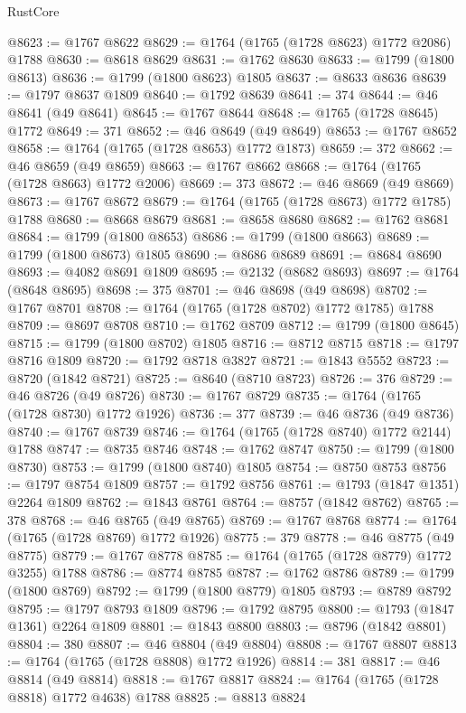 \begin{lexlean}{RustCore}
\begin{coremodule}
@8623 := @1767 @8622
@8629 := @1764 (@1765 (@1728 @8623) @1772 @2086) @1788
@8630 := @8618 @8629
@8631 := @1762 @8630
@8633 := @1799 (@1800 @8613)
@8636 := @1799 (@1800 @8623) @1805
@8637 := @8633 @8636
@8639 := @1797 @8637 @1809
@8640 := @1792 @8639
@8641 := 374
@8644 := @46 @8641 (@49 @8641)
@8645 := @1767 @8644
@8648 := @1765 (@1728 @8645) @1772
@8649 := 371
@8652 := @46 @8649 (@49 @8649)
@8653 := @1767 @8652
@8658 := @1764 (@1765 (@1728 @8653) @1772 @1873)
@8659 := 372
@8662 := @46 @8659 (@49 @8659)
@8663 := @1767 @8662
@8668 := @1764 (@1765 (@1728 @8663) @1772 @2006)
@8669 := 373
@8672 := @46 @8669 (@49 @8669)
@8673 := @1767 @8672
@8679 := @1764 (@1765 (@1728 @8673) @1772 @1785) @1788
@8680 := @8668 @8679
@8681 := @8658 @8680
@8682 := @1762 @8681
@8684 := @1799 (@1800 @8653)
@8686 := @1799 (@1800 @8663)
@8689 := @1799 (@1800 @8673) @1805
@8690 := @8686 @8689
@8691 := @8684 @8690
@8693 := @4082 @8691 @1809
@8695 := @2132 (@8682 @8693)
@8697 := @1764 (@8648 @8695)
@8698 := 375
@8701 := @46 @8698 (@49 @8698)
@8702 := @1767 @8701
@8708 := @1764 (@1765 (@1728 @8702) @1772 @1785) @1788
@8709 := @8697 @8708
@8710 := @1762 @8709
@8712 := @1799 (@1800 @8645)
@8715 := @1799 (@1800 @8702) @1805
@8716 := @8712 @8715
@8718 := @1797 @8716 @1809
@8720 := @1792 @8718 @3827
@8721 := @1843 @5552
@8723 := @8720 (@1842 @8721)
@8725 := @8640 (@8710 @8723)
@8726 := 376
@8729 := @46 @8726 (@49 @8726)
@8730 := @1767 @8729
@8735 := @1764 (@1765 (@1728 @8730) @1772 @1926)
@8736 := 377
@8739 := @46 @8736 (@49 @8736)
@8740 := @1767 @8739
@8746 := @1764 (@1765 (@1728 @8740) @1772 @2144) @1788
@8747 := @8735 @8746
@8748 := @1762 @8747
@8750 := @1799 (@1800 @8730)
@8753 := @1799 (@1800 @8740) @1805
@8754 := @8750 @8753
@8756 := @1797 @8754 @1809
@8757 := @1792 @8756
@8761 := @1793 (@1847 @1351) @2264 @1809
@8762 := @1843 @8761
@8764 := @8757 (@1842 @8762)
@8765 := 378
@8768 := @46 @8765 (@49 @8765)
@8769 := @1767 @8768
@8774 := @1764 (@1765 (@1728 @8769) @1772 @1926)
@8775 := 379
@8778 := @46 @8775 (@49 @8775)
@8779 := @1767 @8778
@8785 := @1764 (@1765 (@1728 @8779) @1772 @3255) @1788
@8786 := @8774 @8785
@8787 := @1762 @8786
@8789 := @1799 (@1800 @8769)
@8792 := @1799 (@1800 @8779) @1805
@8793 := @8789 @8792
@8795 := @1797 @8793 @1809
@8796 := @1792 @8795
@8800 := @1793 (@1847 @1361) @2264 @1809
@8801 := @1843 @8800
@8803 := @8796 (@1842 @8801)
@8804 := 380
@8807 := @46 @8804 (@49 @8804)
@8808 := @1767 @8807
@8813 := @1764 (@1765 (@1728 @8808) @1772 @1926)
@8814 := 381
@8817 := @46 @8814 (@49 @8814)
@8818 := @1767 @8817
@8824 := @1764 (@1765 (@1728 @8818) @1772 @4638) @1788
@8825 := @8813 @8824

\end{coremodule}
\end{lexlean}
